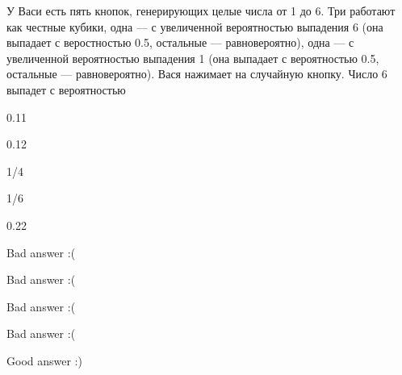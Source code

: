 
\begin{question}
У Васи есть пять кнопок, генерирующих целые числа от 1 до 6. Три
работают как честные кубики, одна — с увеличенной вероятностью
выпадения 6 (она выпадает с веростностью 0.5, остальные ---
равновероятно), одна — с увеличенной вероятностью выпадения 1 (она
выпадает с вероятностью 0.5, остальные — равновероятно). Вася нажимает
на случайную кнопку. Число 6 выпадет с вероятностью
\begin{answerlist}
  \item 0.11
  \item 0.12
  \item 1/4
  \item 1/6
  \item 0.22
\end{answerlist}
\end{question}

\begin{solution}
\begin{answerlist}
  \item Bad answer :(
  \item Bad answer :(
  \item Bad answer :(
  \item Bad answer :(
  \item Good answer :)
\end{answerlist}
\end{solution}

